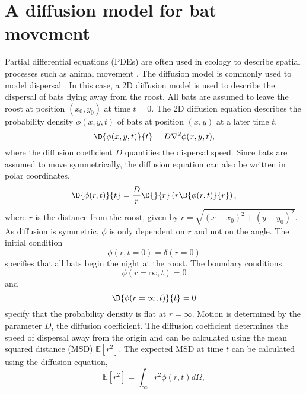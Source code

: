 \section{A diffusion model for bat movement}
%
Partial differential equations (PDEs) are often used in ecology to describe spatial processes such as animal movement \cite{Holmes1994}. The diffusion model is commonly used to model dispersal \cite{Ovaskainen2016}. In this case, a 2D diffusion model is used to describe the dispersal of bats flying away from the roost.
%
All bats are assumed to leave the roost at position $(x_0,y_0)$ at time $t=0$. The 2D diffusion equation describes the probability density $\phi(x,y,t)$ of
bats at position $(x,y)$ at a later time $t$,
%
\begin{equation}
  \D{\phi(x,y,t)}{t} = D \nabla^2 \phi(x,y,t) ,
  \label{eqn:diffusion_cartesian}
\end{equation}
%
where the diffusion coefficient $D$ quantifies the dispersal speed. Since bats are assumed to move symmetrically, the diffusion equation can also be written in polar coordinates,
%
\begin{equation}
\D{ \phi(r,t)}{t} = \frac{D}{r} \D{}{ r} \left( r \D{\phi(r,t)}{r} \right),
\label{eqn:diffusion_polar}
\end{equation}
%
where $r$ is the distance from the roost, given by $r=\sqrt{(x-x_0)^2 + (y-y_0)^2}$. As diffusion is symmetric, $\phi$ is only dependent on $r$ and not on the angle.
%
The initial condition
%
\begin{equation}
\phi(r,t=0) = \delta(r=0)
\label{eqn:IC}
\end{equation}
%
specifies that all bats begin the night at the roost. The boundary conditions
%
\begin{equation}
\phi(r=\infty,t) = 0
\label{eqn:IC}
\end{equation}
%
and
%
\begin{equation}
\D{\phi(r=\infty,t)}{t} = 0
\label{eqn:IC}
\end{equation}
%
specify that the probability density is flat at $r=\infty$.
%
Motion is determined by the parameter $D$, the diffusion coefficient. The diffusion coefficient determines the speed of dispersal away from the origin and can be calculated using the mean squared distance (MSD) $\mathbb{E}[r^2]$. The expected MSD at time $t$ can be calculated using the diffusion equation,
%
\begin{equation}
\mathbb{E}[r^2] = \int_{\infty}r^2 \phi(r,t) d\Omega ,
\label{eqn:MSD_int}
\end{equation}
